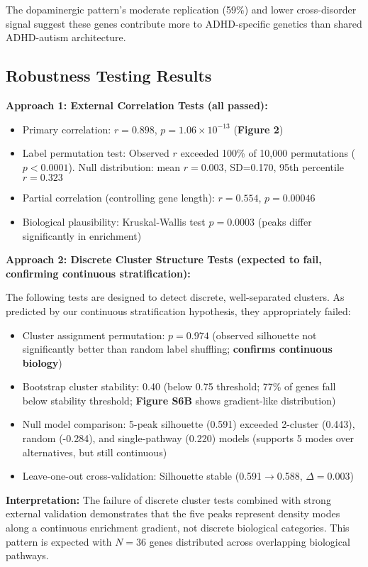 \documentclass[12pt,letterpaper]{article}
\theoremstyle{definition}
\theoremstyle{remark}
\begin{document}
The dopaminergic pattern's moderate replication (59\%) and lower cross-disorder signal suggest these genes contribute more to ADHD-specific genetics than shared ADHD-autism architecture.

\subsection{Robustness Testing Results}

\textbf{Approach 1: External Correlation Tests (all passed):}
\begin{itemize}
    \item Primary correlation: $r=0.898$, $p=1.06 \times 10^{-13}$ (\textbf{Figure 2})
    \item Label permutation test: Observed $r$ exceeded 100\% of 10,000 permutations ($p<0.0001$). Null distribution: mean $r=0.003$, SD=0.170, 95th percentile $r=0.323$
    \item Partial correlation (controlling gene length): $r=0.554$, $p=0.00046$
    \item Biological plausibility: Kruskal-Wallis test $p=0.0003$ (peaks differ significantly in enrichment)
\end{itemize}

\textbf{Approach 2: Discrete Cluster Structure Tests (expected to fail, confirming continuous stratification):}

The following tests are designed to detect discrete, well-separated clusters. As predicted by our continuous stratification hypothesis, they appropriately failed:
\begin{itemize}
    \item Cluster assignment permutation: $p=0.974$ (observed silhouette not significantly better than random label shuffling; \textbf{confirms continuous biology})
    \item Bootstrap cluster stability: 0.40 (below 0.75 threshold; 77\% of genes fall below stability threshold; \textbf{Figure S6B} shows gradient-like distribution)
    \item Null model comparison: 5-peak silhouette (0.591) exceeded 2-cluster (0.443), random (-0.284), and single-pathway (0.220) models (supports 5 modes over alternatives, but still continuous)
    \item Leave-one-out cross-validation: Silhouette stable (0.591$\rightarrow$0.588, $\Delta=0.003$)
\end{itemize}

\textbf{Interpretation:} The failure of discrete cluster tests combined with strong external validation demonstrates that the five peaks represent density modes along a continuous enrichment gradient, not discrete biological categories. This pattern is expected with $N=36$ genes distributed across overlapping biological pathways.
\end{document}
